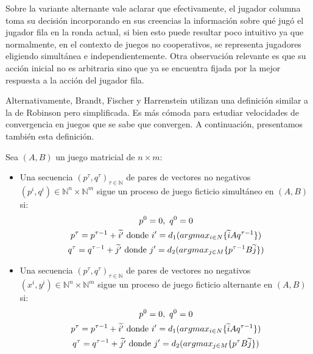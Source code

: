Sobre la variante alternante vale aclarar que efectivamente, el jugador columna toma su decisión incorporando en sus creencias la información sobre qué jugó el jugador fila en la ronda actual, si bien esto puede resultar poco intuitivo ya que normalmente, en el contexto de juegos no cooperativos, se representa jugadores eligiendo simultánea e independientemente. Otra observación relevante es que su acción inicial no es arbitraria sino que ya se encuentra fijada por la mejor respuesta a la acción del jugador fila.

Alternativamente, Brandt, Fischer y Harrenstein \cite{brandt:rate:convergence} utilizan una definición similar a la de Robinson \cite{robinson:zerosum} pero simplificada. Es más cómoda para estudiar velocidades de convergencia en juegos que se sabe que convergen. A continuación, presentamos también esta definición.

\begin{definition} \label{def:fp:brandt}
    Sea $(A, B)$ un juego matricial de $n \times m$:
    \begin{itemize}
        \item Una secuencia $(p^\tau, q^\tau)_{\tau \in \mathbb{N}}$ de pares de vectores no negativos $(p^i, q^i) \in \mathbb{N}^n \times \mathbb{N}^m$ sigue un proceso de juego ficticio simultáneo en $(A, B)$ si:
        \begin{gather*}
            p^0 = \boldmath{0},\ q^0 = \boldmath{0} \\
            p^{\tau} = p^{\tau-1} + \widetilde{i'} \text{\ donde $i' = d_1(argmax_{i \in N}\{\widetilde{i}Aq^{\tau-1}\})$} \\
            q^{\tau} = q^{\tau-1} + \widetilde{j'} \text{\ donde $j' = d_2(argmax_{j \in M}\{p^{\tau-1}B\widetilde{j}\})$}
        \end{gather*}
        \item Una secuencia $(p^\tau, q^\tau)_{\tau \in \mathbb{N}}$  de pares de vectores no negativos $(x^i, y^i) \in \mathbb{N}^n \times \mathbb{N}^m$ sigue un proceso de juego ficticio alternante en $(A, B)$ si:
        \begin{gather*}
            p^0 = \boldmath{0},\ q^0 = \boldmath{0} \\
            p^{\tau} = p^{\tau-1} + \widetilde{i'} \text{\ donde $i' = d_1(argmax_{i \in N}\{\widetilde{i}Aq^{\tau-1}\})$} \\
            q^{\tau} = q^{\tau-1} + \widetilde{j'} \text{\ donde $j' = d_2(argmax_{j \in M}\{p^{\tau}B\widetilde{j}\})$}
        \end{gather*}
    \end{itemize}
\end{definition}

